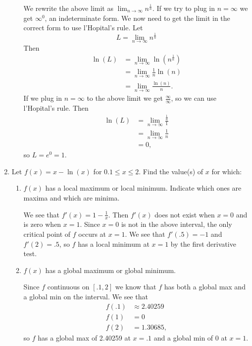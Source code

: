 \documentclass[11pt]{article}
\begin{document}
\begin{enumerate}
\begin{enumerate}
    \vfill

    We rewrite the above limit as $\displaystyle\lim_{n\to
      \infty}n^{\frac{1}{n}}$. If we try to plug in $n=\infty$ we get
    $\infty^0$, an indeterminate form.  We now need to get the limit
    in the correct form to use l'Hopital's rule.  Let
    \[
    L = \displaystyle\lim_{n\to \infty}n^{\frac{1}{n}}
    \]
    Then
    \begin{align*}
      \ln(L) &= \lim_{n\to \infty}\ln\left(n^{\frac{1}{n}}\right)\\
      &= \lim_{n\to \infty}\frac{1}{n}\ln(n)\\
      &= \lim_{n\to \infty}\frac{\ln(n)}{n}.
    \end{align*}
    If we plug in $n=\infty$ to the above limit we get
    $\frac{\infty}{\infty}$, so we can use l'Hopital's rule.  Then
    \begin{align*}
      \ln(L) &= \lim_{n\to \infty} \frac{\frac{1}{n}}{1}\\
      &= \lim_{n\to\infty}\frac{1}{n}\\
      &= 0,
    \end{align*}
    so $L=e^0=1$.
    
    \vfill
  \end{enumerate}
  \newpage


\item Let $f(x)=x-\ln(x)$ for $0.1\leq x\leq 2$. Find the value(s) of
  $x$ for which:
  \begin{enumerate}
  \item $f(x)$ has a local maximum or local minimum. Indicate which
    ones are maxima and which are minima.

    \vfill

    We see that $f'(x) = 1-\frac{1}{x}$.  Then $f'(x)$ does not exist
    when $x=0$ and is zero when $x=1$.  Since $x=0$ is not in the
    above interval, the only critical point of $f$ occurs at $x=1$.
    We see that $f'(.5)=-1$ and $f'(2)=.5$, so $f$ has a local minimum
    at $x=1$ by the first derivative test.

    \vfill
    
  \item $f(x)$ has a global maximum or global minimum.

    \vfill

    Since $f$ continuous on $[.1,2]$ we know that $f$ has both a
    global max and a global min on the interval.  We see that
    \begin{align*}
      f(.1) &\approx 2.40259\\
      f(1) &= 0\\
      f(2) &= 1.30685,
    \end{align*}
    so $f$ has a global max of 2.40259 at $x=.1$ and a global min of 0
    at $x=1$.


\end{enumerate}
\end{enumerate}
\end{document}
